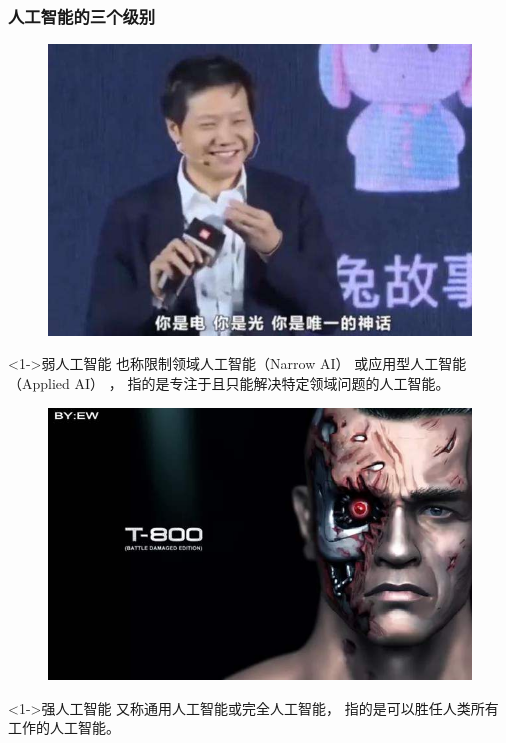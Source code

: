 \documentclass[10pt,aspectratio=43,mathserif,table]{beamer}
\begin{document}
\begin{frame}[allowframebreaks]
	\frametitle{人工智能的三个级别}

	\begin{figure}[htbp]
		\centering
		\includegraphics[scale=0.25]{figures/xiaomi.jpg}
	\end{figure}
	\begin{block}<1->{弱人工智能}
		也称限制领域人工智能（Narrow AI） 或应用型人工智能（Applied AI） ， 指的是专注于且只能解决特定领域问题的人工智能。
	\end{block}
	\framebreak
	\begin{figure}[htbp]
		\centering
		\includegraphics[scale=0.25]{figures/zhongjie.jpg}
	\end{figure}
	\begin{block}<1->{强人工智能}
		又称通用人工智能或完全人工智能， 指的是可以胜任人类所有工作的人工智能。
	\end{block}

\end{frame}
\end{document}
